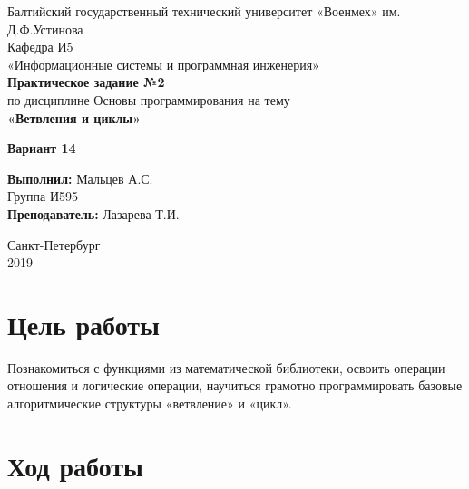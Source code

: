 \documentclass[a4paper,14pt]{extarticle}
\begin{document}
\begin{titlepage}
\centering
\small Балтийский государственный технический университет «Военмех» им. Д.Ф.Устинова \\
\vspace{3cm}
\normalsize Кафедра И5\\
«Информационные системы и программная инженерия»\\
\vspace{3cm}
\textbf{Практическое задание №2}\\
по дисциплине Основы программирования на тему\\ 
\textbf{«Ветвления и циклы»}\\
\begin{center}
{\large\bf Вариант 14}
\end{center}
\vfill

\begin{flushleft}
\textbf{Выполнил:}
\hfill {Мальцев А.С.} \\
\hfill {Группа И595} \\
\vspace{1cm}
\textbf{Преподаватель:}
\hfill {Лазарева Т.И.} \\
\end{flushleft}
\vspace{3cm}

{\centering Санкт-Петербург \\ 
\vspace{0.15cm}
2019}
\end{titlepage}

\section{Цель работы}
Познакомиться с функциями из математической библиотеки, освоить операции отношения и логические операции, научиться грамотно программировать базовые алгоритмические структуры «ветвление» и «цикл».
\setcounter{page}{2}

\section{Ход работы}
\end{document}
